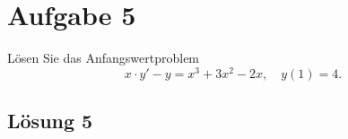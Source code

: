 \documentclass[main.tex]{subfiles}
\begin{document}
\section{Aufgabe 5}
Lösen Sie das Anfangswertproblem 
\[
    x \cdot y' - y = x^3 + 3x^2 - 2x, \quad y(1) = 4.
\]

\subsection{Lösung 5}
\end{document}
